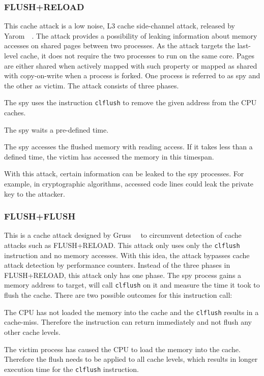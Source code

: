 \subsubsection{FLUSH+RELOAD}

This cache attack is a low noise, L3 cache side-channel attack, released
by Yarom~\etal~\cite{flushreload}. The attack provides a possibility of leaking
information about memory accesses on shared pages between two processes. As the
attack targets the last-level cache, it does not require the two processes to
run on the same core. Pages are either shared when actively mapped with such
property or mapped as shared with copy-on-write when a process is forked. One
process is referred to as spy and the other as victim. The attack consists of
three phases.

\begin{enumerate}
\begin{samepage}
\item The spy uses the instruction \texttt{clflush} to remove the given address
from the CPU caches.
\item The spy waits a pre-defined time.
\item The spy accesses the flushed memory with reading access. If it takes less
than a defined time, the victim has accessed the memory in this timespan.
\end{samepage}
\end{enumerate}

With this attack, certain information can be leaked to the spy processes. For
example, in cryptographic algorithms, accessed code lines could leak the private
key to the attacker.

\subsubsection{FLUSH+FLUSH}

This is a cache attack designed by Gruss~\etal~\cite{flushflush} to circumvent
detection of cache attacks such as FLUSH+RELOAD. This attack only uses only the
\texttt{clflush} instruction and no memory accesses. With this idea, the attack
bypasses cache attack detection by performance counters. Instead of the three
phases in FLUSH+RELOAD, this attack only has one phase. The spy process gains a
memory address to target, will call \texttt{clflush} on it and measure the time
it took to flush the cache. There are two possible outcomes for this instruction
call:

\begin{itemize}
\begin{samepage}
\item The CPU has not loaded the memory into the cache and the \texttt{clflush}
results in a cache-miss. Therefore the instruction can return immediately and
not flush any other cache levels.
\item The victim process has caused the CPU to load the memory into the cache.
Therefore the flush needs to be applied to all cache levels, which results in
longer execution time for the \texttt{clflush} instruction.
\end{samepage}
\end{itemize}


